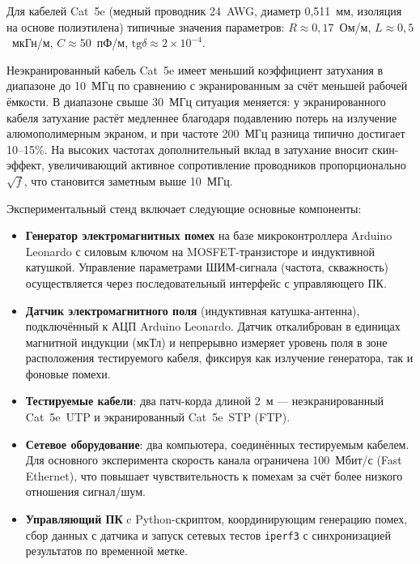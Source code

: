 Для кабелей Cat~5e (медный проводник 24~AWG, диаметр 0{,}511~мм,
изоляция на основе полиэтилена) типичные значения параметров:
$R \approx 0{,}17$~Ом/м, $L \approx 0{,}5$~мкГн/м,
$C \approx 50$~пФ/м, $\mathrm{tg}\delta \approx 2 \times 10^{-4}$.

Неэкранированный кабель Cat~5e
имеет меньший коэффициент затухания в диапазоне до 10~МГц
по сравнению с экранированным за счёт меньшей рабочей ёмкости.
В диапазоне свыше 30~МГц ситуация меняется: у экранированного кабеля
затухание растёт медленнее благодаря подавлению потерь на излучение
алюмополимерным экраном, и при частоте 200~МГц
разница типично достигает 10--15\%.
На высоких частотах дополнительный вклад в затухание вносит
скин-эффект, увеличивающий активное сопротивление проводников
пропорционально $\sqrt{f}$, что становится заметным выше 10~МГц.



Экспериментальный стенд включает следующие основные компоненты:

\begin{itemize}
  \item \textbf{Генератор электромагнитных помех} на базе микроконтроллера Arduino Leonardo с силовым ключом на MOSFET-транзисторе и индуктивной катушкой. Управление параметрами ШИМ-сигнала (частота, скважность) осуществляется через последовательный интерфейс с управляющего ПК.
  \item \textbf{Датчик электромагнитного поля} (индуктивная катушка-антенна), подключённый к АЦП Arduino Leonardo. Датчик откалиброван в единицах магнитной индукции (мкТл) и непрерывно измеряет уровень поля в зоне расположения тестируемого кабеля, фиксируя как излучение генератора, так и фоновые помехи.
  \item \textbf{Тестируемые кабели}: два патч-корда длиной 2~м — неэкранированный Cat~5e~UTP и экранированный Cat~5e~STP (FTP).
  \item \textbf{Сетевое оборудование}: два компьютера, соединённых тестируемым кабелем. Для основного эксперимента скорость канала ограничена 100~Мбит/с (Fast Ethernet), что повышает чувствительность к помехам за счёт более низкого отношения сигнал/шум.
  \item \textbf{Управляющий ПК} c Python-скриптом, координирующим генерацию помех, сбор данных с датчика и запуск сетевых тестов \texttt{iperf3} с синхронизацией результатов по временной метке.
\end{itemize}

